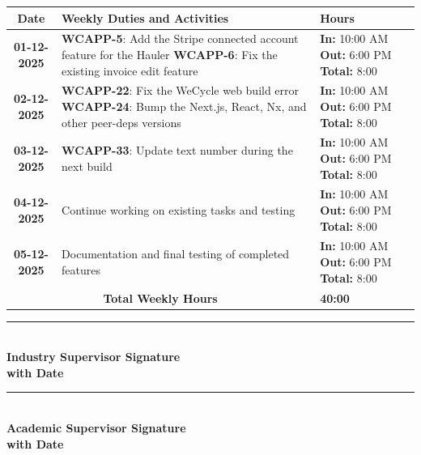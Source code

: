 \documentclass[a4paper,11pt]{article}
\begin{document}
\begin{tabularx}{\textwidth}{|c|>{\raggedright\arraybackslash}X|>{\centering\arraybackslash}m{3.5cm}|}
\hline
\rowcolor{gray!30}
\textbf{Date} & \textbf{Weekly Duties and Activities} & \textbf{Hours} \\
\hline
\textbf{01-12-2025} & \textbf{WCAPP-5}: Add the Stripe connected account feature for the Hauler \newline \textbf{WCAPP-6}: Fix the existing invoice edit feature & \textbf{In:} 10:00 AM \newline \textbf{Out:} 6:00 PM \newline \textbf{Total:} 8:00 \\
\hline
\textbf{02-12-2025} & \textbf{WCAPP-22}: Fix the WeCycle web build error \newline \textbf{WCAPP-24}: Bump the Next.js, React, Nx, and other peer-deps versions & \textbf{In:} 10:00 AM \newline \textbf{Out:} 6:00 PM \newline \textbf{Total:} 8:00 \\
\hline
\textbf{03-12-2025} & \textbf{WCAPP-33}: Update text number during the next build & \textbf{In:} 10:00 AM \newline \textbf{Out:} 6:00 PM \newline \textbf{Total:} 8:00 \\
\hline
\textbf{04-12-2025} & Continue working on existing tasks and testing & \textbf{In:} 10:00 AM \newline \textbf{Out:} 6:00 PM \newline \textbf{Total:} 8:00 \\
\hline
\textbf{05-12-2025} & Documentation and final testing of completed features & \textbf{In:} 10:00 AM \newline \textbf{Out:} 6:00 PM \newline \textbf{Total:} 8:00 \\
\hline
\multicolumn{2}{|c|}{\textbf{Total Weekly Hours}} & \textbf{40:00} \\
\hline
\end{tabularx}

\vspace{3em}

\noindent
\begin{minipage}[t]{0.45\textwidth}
\rule{0.8\textwidth}{0.4pt} \\
\textbf{Industry Supervisor Signature} \\
\textbf{with Date}
\end{minipage}
\hfill
\begin{minipage}[t]{0.45\textwidth}
\rule{0.8\textwidth}{0.4pt} \\
\textbf{Academic Supervisor Signature} \\
\textbf{with Date}
\end{minipage}
\end{document}
